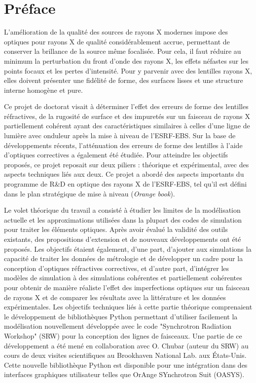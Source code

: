 \chapter*{Préface}

L'amélioration de la qualité des sources de rayons X modernes impose des optiques pour rayons X de qualité considérablement accrue, permettant de conserver la brillance de la source même focalisée.  Pour cela, il faut réduire au minimum la perturbation du front d'onde des rayons X, les effets néfastes sur les points focaux et les pertes d'intensité. Pour y parvenir avec des lentilles rayons X, elles doivent présenter une fidélité de forme, des surfaces lisses et une structure interne homogène et pure. 

Ce projet de doctorat visait à déterminer l'effet des erreurs de forme des lentilles réfractives, de la rugosité de surface et des impuretés sur un faisceau de rayons X partiellement cohérent ayant des caractéristiques similaires à celles d’une ligne de lumière avec onduleur après la mise à niveau de l'ESRF-EBS. Sur la base de développements récents, l'atténuation des erreurs de forme des lentilles à l'aide d'optiques correctives a également été étudiée. Pour atteindre les objectifs proposés, ce projet reposait sur deux piliers : théorique et expérimental, avec des aspects techniques liés aux deux. Ce projet a abordé des aspects importants du programme de R\&D en optique des rayons X de l'ESRF-EBS, tel qu'il est défini dans le plan stratégique de mise à niveau (\textit{Orange book}).

Le volet théorique du travail a consisté à étudier les limites de la modélisation actuelle et les approximations utilisées dans la plupart des codes de simulation pour traiter les éléments optiques. Après avoir évalué la validité des outils existants, des propositions d'extension et de nouveaux développements ont été proposés. Les objectifs étaient également, d’une part, d'ajouter aux simulations la capacité de traiter les données de métrologie et de développer un cadre pour la conception d'optiques réfractives correctives, et d’autre part, d’intégrer les modèles de simulation à des simulations cohérentes et partiellement cohérentes pour obtenir de manière réaliste l'effet des imperfections optiques sur un faisceau de rayons X et de comparer les résultats avec la littérature et les données expérimentales. Les objectifs techniques liés à cette partie théorique comprenaient le développement de bibliothèques Python permettant d'utiliser facilement la modélisation nouvellement développée avec le code "Synchrotron Radiation Workshop" (SRW) pour la conception des lignes de faisceaux. Une partie de ce développement a été mené en collaboration avec O. Chubar (auteur du SRW) au cours de deux visites scientifiques au Brookhaven National Lab. aux États-Unis. Cette nouvelle bibliothèque Python est disponible pour une intégration dans des interfaces graphiques utilisateur telles que OrAnge SYnchrotron Suit (OASYS). 

